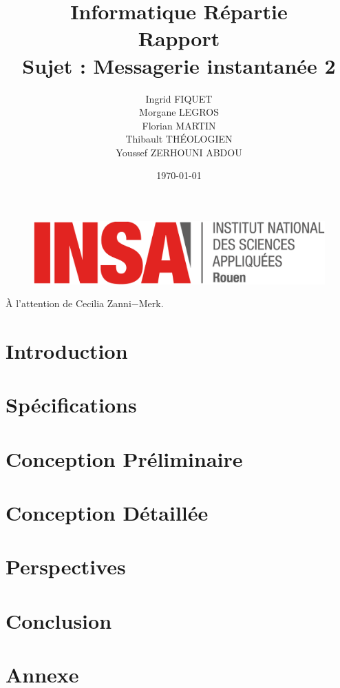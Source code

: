 \documentclass[a4paper,12pt]{article}
\title{\huge Informatique Répartie\\Rapport\\Sujet : Messagerie instantanée 2}
\author{Ingrid FIQUET\\Morgane LEGROS\\Florian MARTIN\\Thibault THÉOLOGIEN\\Youssef ZERHOUNI ABDOU}
\date{\today}
\begin{document}
	\begin{titlepage}
		\vfill
		\begin{figure}
			\includegraphics[scale=0.3]{img/logoINSARouen.png}
		\end{figure}

		\maketitle
		
		     
    \begin{center} 
    \LARGE
      \addvspace{10mm} 
      À l'attention de Cecilia Zanni$-$Merk. 
    \end{center} 

		\vfill
		\noindent \hrulefill

	\end{titlepage}



\newpage
\tableofcontents{}

\newpage
\part{Introduction}
	

\newpage
\part{Spécifications}
	
	
\newpage
\part{Conception Préliminaire}
	
	
\newpage
\part{Conception Détaillée}
	

\newpage
\part{Perspectives}
	
	
\newpage
\part{Conclusion}
	

\newpage
\part{Annexe}
\end{document}
